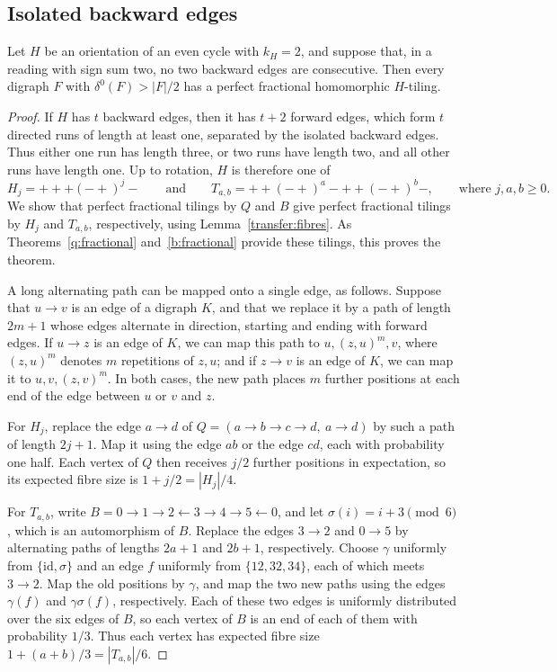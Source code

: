 \subsection{Isolated backward edges}
\label{transfers}

\begin{theorem}\label{imbalance402:isolated}
\label{transfer:Qfamily}\label{transfer:Bfamily}
Let $H$ be an orientation of an even cycle with $k_H=2$, and suppose that, in a reading with sign sum two, no two backward edges are consecutive. Then every digraph $F$ with $\delta^0(F)>|F|/2$ has a
perfect fractional homomorphic $H$-tiling.
\end{theorem}
\begin{proof}
If $H$ has $t$ backward edges, then it has $t+2$ forward edges, which form $t$ directed runs of length at least one, separated by the isolated backward edges. Thus either one run has length three, or two runs have length two, and all
other runs have length one. Up to rotation, $H$ is therefore one of
\[
 H_j=+++(-+)^j-\qquad\text{and}\qquad
 T_{a,b}=++(-+)^a-++(-+)^b-,\qquad\text{where }j,a,b\ge0.
\]
We show that perfect fractional tilings by $Q$ and $B$ give perfect fractional tilings by $H_j$ and $T_{a,b}$, respectively, using Lemma~\ref{transfer:fibres}. As Theorems~\ref{q:fractional} and~\ref{b:fractional} provide these tilings, this proves the theorem.

A long alternating path can be mapped onto a single edge, as follows. Suppose that $u\to v$ is an edge of a digraph $K$, and that we replace it by a path of length $2m+1$ whose edges alternate in direction, starting and ending with forward edges. If $u\to z$ is an edge of $K$, we can map this path to $u,(z,u)^m,v$, where $(z,u)^m$ denotes $m$ repetitions of $z,u$; and if $z\to v$ is an edge of $K$, we can map it to $u,v,(z,v)^m$. In both cases, the new path places $m$ further positions at each end of the edge between $u$ or $v$ and $z$.

For $H_j$, replace the edge $a\to d$ of
$Q=(a\to b\to c\to d,\ a\to d)$ by such a path of length $2j+1$.
Map it using the edge $ab$ or the edge $cd$, each with probability one half.
Each vertex of $Q$ then receives $j/2$ further positions in expectation, so its expected fibre size is $1+j/2=|H_j|/4$.

For $T_{a,b}$, write
$B=0\to1\to2\leftarrow3\to4\to5\leftarrow0$, and let $\sigma(i)=i+3\pmod6$, which is an automorphism of $B$.
Replace the edges $3\to2$ and $0\to5$ by alternating paths of lengths $2a+1$ and $2b+1$, respectively.
Choose $\gamma$ uniformly from $\{\mathrm{id},\sigma\}$ and an edge $f$
uniformly from $\{12,32,34\}$, each of which meets $3\to2$.
Map the old positions by $\gamma$, and map the two new paths using the edges
$\gamma(f)$ and $\gamma\sigma(f)$, respectively.
Each of these two edges is uniformly distributed over the six edges of $B$, so each vertex of $B$ is an end of each of them with probability
$1/3$. Thus each vertex has expected fibre size
$1+(a+b)/3=|T_{a,b}|/6$.


\end{proof}
